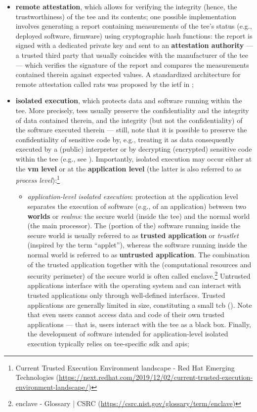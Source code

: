\begin{itemize}
	\item \textbf{remote attestation}, which allows for verifying the integrity (hence, the trustworthiness) of the \gls{tee} and its contents; one possible implementation involves generating a report containing measurements of the \gls{tee}'s status (e.g., deployed software, firmware) using cryptographic hash functions: the report is signed with a dedicated private key and sent to an \textbf{attestation authority} --- a trusted third party that usually coincides with the manufacturer of the \gls{tee} --- which verifies the signature of the report and compares the measurements contained therein against expected values. A standardized architecture for remote attestation called \gls{rats} was proposed by the \gls{ietf} in \cite{rfc9334};
	\item \textbf{isolated execution}, which protects data and software running within the \gls{tee}. More precisely, \glspl{tee} usually preserve the confidentiality and the integrity of data contained therein, and the integrity (but not the confidentiality) of the software executed therein --- still, note that it is possible to preserve the confidentiality of sensitive code by, e.g., treating it as data consequently executed by a (public) interpreter or by decrypting (encrypted) sensitive code within the \gls{tee} (e.g., see \cite{quarta_tarnhelm_2021}). Importantly, isolated execution may occur either at the \textbf{\gls{vm} level} or at the \textbf{application level} (the latter is also referred to as \textit{process level}):\footnote{Current Trusted Execution Environment landscape - Red Hat Emerging Technologies (\url{https://next.redhat.com/2019/12/02/current-trusted-execution-environment-landscape/})}
	\begin{itemize}
		\item \textit{application-level isolated execution}: protection at the application level separates the execution of software (e.g., of an application) between two \textbf{worlds} or \textit{realms}: the secure world (inside the \gls{tee}) and the normal world (the main processor). The (portion of the) software running inside the secure world is usually referred to as \textbf{trusted application} or \textit{trustlet} (inspired by the term ``applet''), whereas the software running inside the normal world is referred to as \textbf{untrusted application}. The combination of the trusted application together with the (computational resources and security perimeter) of the secure world is often called enclave.\footnote{enclave - Glossary | CSRC (\url{https://csrc.nist.gov/glossary/term/enclave})} Untrusted applications interface with the operating system and can interact with trusted applications only through well-defined interfaces. Trusted applications are generally limited in size, constituting a small \gls{tcb} (). Note that even users cannot access data and code of their own trusted applications --- that is, users interact with the \gls{tee} as a black box. Finally, the development of software intended for application-level isolated execution typically relies on \gls{tee}-specific \gls{sdk} and \glspl{api};

\end{itemize}
\end{itemize}
